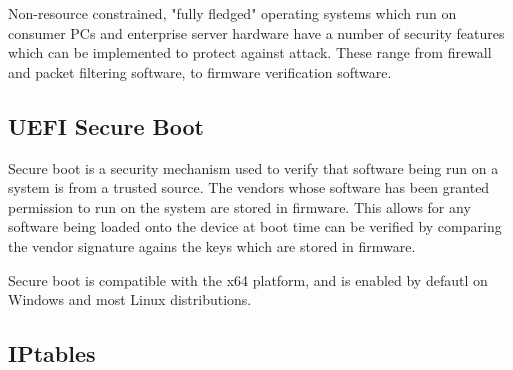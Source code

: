 Non-resource constrained, "fully fledged" operating systems which run on
consumer PCs and enterprise server hardware have a number of security features
which can be implemented to protect against attack. These range from firewall
and packet filtering software, to firmware verification software.

\subsection{UEFI Secure Boot}

Secure boot is a security mechanism used to verify that software being run on a
system is from a trusted source. The vendors whose software has been granted
permission to run on the system are stored in firmware. This allows for any
software being loaded onto the device at boot time can be verified by comparing
the vendor signature agains the keys which are stored in firmware.

Secure boot is compatible with the x64 platform, and is enabled by defautl on
Windows and most Linux distributions.

\subsection{IPtables}
